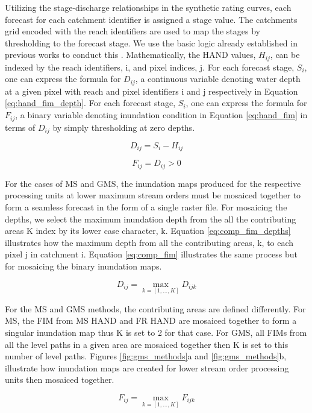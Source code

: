\documentclass[draft]{dependencies/agujournal2019}
\begin{document}
Utilizing the stage-discharge relationships in the synthetic rating curves, each forecast for each catchment identifier is assigned a stage value. 
The catchments grid encoded with the reach identifiers are used to map the stages by thresholding to the forecast stage.
We use the basic logic already established in previous works to conduct this \cite{nobre2016hand,liu2016cybergis,maidment2017conceptual}.
Mathematically, the HAND values, $H_{ij}$, can be indexed by the reach identifiers, i, and pixel indices, j.
For each forecast stage, $S_i$, one can express the formula for $D_{ij}$, a continuous variable denoting water depth at a given pixel with reach and pixel identifiers i and j respectively in Equation \ref{eq:hand_fim_depth}.
For each forecast stage, $S_i$, one can express the formula for $F_{ij}$, a binary variable denoting inundation condition in Equation \ref{eq:hand_fim} in terms of $D_{ij}$ by simply thresholding at zero depths.
%
\begin{linenomath*}
\begin{equation}
\label{eq:hand_fim_depth}
    D_{ij} = S_i - H_{ij}
\end{equation}
\end{linenomath*}
%
\begin{linenomath*}
\begin{equation}
\label{eq:hand_fim}
    F_{ij} = D_{ij} > 0
\end{equation}
\end{linenomath*}
%
For the cases of MS and GMS, the inundation maps produced for the respective processing units at lower maximum stream orders must be mosaiced together to form a seamless forecast in the form of a single raster file.
For mosaicing the depths, we select the maximum inundation depth from the all the contributing areas K index by its lower case character, k.
Equation \ref{eq:comp_fim_depths} illustrates how the maximum depth from all the contributing areas, k, to each pixel j in catchment i.
Equation \ref{eq:comp_fim} illustrates the same process but for mosaicing the binary inundation maps.
%
\begin{linenomath*}
\begin{equation}
\label{eq:comp_fim_depths}
    D_{ij} = \max_{k=[1,...,K]} D_{ijk}
\end{equation}
\end{linenomath*}
%
For the MS and GMS methods, the contributing areas are defined differently.
For MS, the FIM from MS HAND and FR HAND are mosaiced together to form a singular inundation map thus K is set to 2 for that case.
For GMS, all FIMs from all the level paths in a given area are mosaiced together then K is set to this number of level paths.
Figures \ref{fig:gms_methods}a and \ref{fig:gms_methods}b, illustrate how inundation maps are created for lower stream order processing units then mosaiced together.
%
\begin{linenomath*}
\begin{equation}
\label{eq:comp_fim}
    F_{ij} = \max_{k=[1,...,K]} F_{ijk}
\end{equation}
\end{linenomath*}
%
\end{document}
